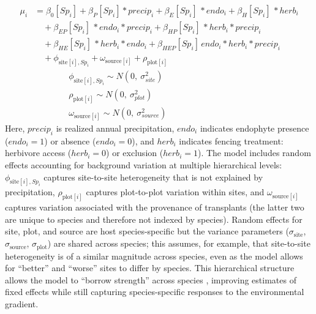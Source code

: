 \documentclass[12pt]{article}\usepackage[]{graphicx}\usepackage[dvipsnames]{xcolor}
\begin{document}
\begin{equation}\label{eq:full_model}
\begin{aligned}
\mu_i &= \beta_0[Sp_i] + \beta_P[Sp_i] * precip_i + \beta_{E}[Sp_i]\, * endo_i + \beta_{H}[Sp_i]\, * herb_i \\
&\quad + \beta_{EP}[Sp_i]\, * endo_i * precip_i 
       + \beta_{HP}[Sp_i]\, * herb_i * precip_i \\
&\quad + \beta_{HE}[Sp_i]\, * herb_i * endo_i + \beta_{HEP}[Sp_i]\, endo_i * herb_i * precip_i \\
&\quad  + \phi_{\text{site}[i],Sp_i} 
       + \omega_{\text{source}[i]} 
       + \rho_{\text{plot}[i]}
       \\
&\quad \quad \quad \quad \phi_{\text{site}[i],Sp_i} \sim N(0,\ \sigma^2_{site})\\
&\quad \quad \quad \quad \rho_{\text{plot}[i]} \sim N(0,\ \sigma^2_{plot})\\
&\quad \quad \quad \quad \omega_{\text{source}[i]} \sim N(0,\ \sigma^2_{source})
\end{aligned}
\end{equation}
\noindent Here, $precip_i$ is realized annual precipitation, $endo_i$ indicates endophyte presence ($endo_i=1$) or absence ($endo_i=0$), and $herb_i$ indicates fencing treatment: herbivore access ($herb_i=0$) or exclusion ($herb_i=1$). 
The model includes random effects accounting for background variation at multiple hierarchical levels: $\phi_{\text{site}[i],Sp_i}$ captures site-to-site heterogeneity that is not explained by precipitation, $\rho_{\text{plot}[i]}$ captures plot-to-plot variation within sites, and $\omega_{\text{source}[i]}$ captures variation associated with the provenance of transplants (the latter two are unique to species and therefore not indexed by species).
Random effects for site, plot, and source are host species-specific but the variance parameters ($\sigma_{\text{site}}$, $\sigma_{\text{source}}$, $\sigma_{\text{plot}}$) are shared across species; this assumes, for example, that site-to-site heterogeneity is of a similar magnitude across species, even as the model allows for ``better'' and ``worse'' sites to differ by species. 
This hierarchical structure allows the model to ``borrow strength'' across species \citep{gelman2007data}, improving estimates of fixed effects while still capturing species-specific responses to the environmental gradient.
\end{document}
